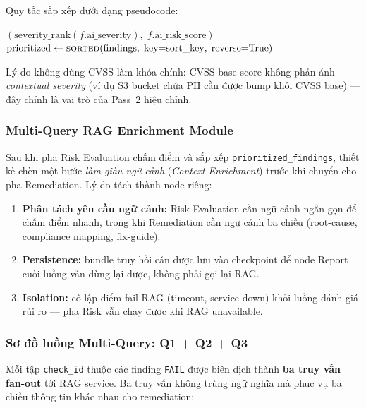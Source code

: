 Quy tắc sắp xếp dưới dạng pseudocode:
\begin{algorithmic}[1]
    \State \Return $(\text{severity\_rank}(f.\text{ai\_severity}),\; f.\text{ai\_risk\_score})$
  \EndFunction
  \State $\text{prioritized} \gets \textsc{sorted}(\text{findings},\; \text{key=sort\_key},\; \text{reverse=True})$
\end{algorithmic}

Lý do không dùng CVSS làm khóa chính: CVSS base score không phản ánh \textit{contextual severity} (ví dụ S3 bucket chứa PII cần được bump khỏi CVSS base) — đây chính là vai trò của Pass~2 hiệu chỉnh.

\subsubsection*{Multi-Query RAG Enrichment Module}
\label{subsec:rag_enrich_module}

Sau khi pha Risk Evaluation chấm điểm và sắp xếp \texttt{prioritized\_findings}, thiết kế chèn một bước \textit{làm giàu ngữ cảnh} (\textit{Context Enrichment}) trước khi chuyển cho pha Remediation. Lý do tách thành node riêng:
\begin{enumerate}
  \item \textbf{Phân tách yêu cầu ngữ cảnh:} Risk Evaluation cần ngữ cảnh ngắn gọn để chấm điểm nhanh, trong khi Remediation cần ngữ cảnh ba chiều (root-cause, compliance mapping, fix-guide).
  \item \textbf{Persistence:} bundle truy hồi cần được lưu vào checkpoint để node Report cuối luồng vẫn dùng lại được, không phải gọi lại RAG.
  \item \textbf{Isolation:} cô lập điểm fail RAG (timeout, service down) khỏi luồng đánh giá rủi ro — pha Risk vẫn chạy được khi RAG unavailable.
\end{enumerate}

\subsubsection*{Sơ đồ luồng Multi-Query: Q1 + Q2 + Q3}
Mỗi tập \texttt{check\_id} thuộc các finding \texttt{FAIL} được biên dịch thành \textbf{ba truy vấn fan-out} tới RAG service. Ba truy vấn không trùng ngữ nghĩa mà phục vụ ba chiều thông tin khác nhau cho remediation:

